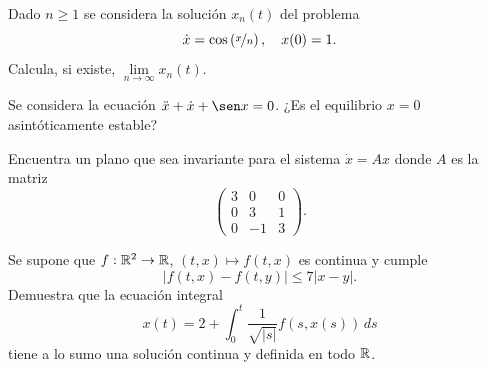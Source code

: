 \documentclass[12pt]{article}
\begin{document}
    \begin{ejercicio}
        Dado $n \geq 1$ se considera la solución $x_n(t)$ del problema
        \[ \dot{x} = \cos\left(\nicefrac{x}{n}\right), \quad x(0) = 1. \]
        Calcula, si existe, $\lim\limits_{n\to\infty} x_n(t)$.
    \end{ejercicio}

    \begin{ejercicio}
        Se considera la ecuación $\ddot{x} + \dot{x} + \sen x = 0$. ¿Es el equilibrio $x = 0$ asintóticamente estable?
    \end{ejercicio}

    \begin{ejercicio}
        Encuentra un plano que sea invariante para el sistema $\dot{x} = Ax$ donde $A$ es la matriz
        \[ \begin{pmatrix} 3 & 0 & 0 \\ 0 & 3 & 1 \\ 0 & -1 & 3 \end{pmatrix}. \]
    \end{ejercicio}

    \begin{ejercicio}
        Se supone que $f : \mathbb{R}^2 \to \mathbb{R}$, $(t,x) \mapsto f(t,x)$ es continua y cumple
        \[ |f(t,x) - f(t,y)| \leq 7|x - y|. \]
        Demuestra que la ecuación integral
        \[ x(t) = 2 + \int_0^t \frac{1}{\sqrt{|s|}} f(s, x(s)) \, ds \]
        tiene a lo sumo una solución continua y definida en todo $\mathbb{R}$.
    \end{ejercicio}

    \newpage
    \setcounter{ejercicio}{0} %
\end{document}
